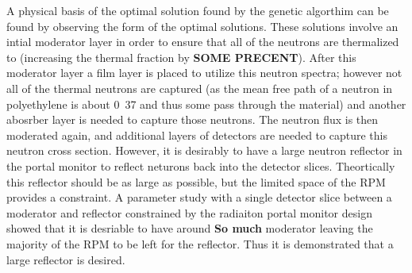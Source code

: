 A physical basis of the optimal solution found by the genetic algorthim can be found by observing the form of the optimal solutions.
These solutions involve an intial moderator layer in order to ensure that all of the neutrons are thermalized to (increasing the thermal fraction by \textbf{SOME PRECENT}).
After this moderator layer a film layer is placed to utilize this neutron spectra; however not all of the thermal neutrons are captured (as the mean free path of a neutron in polyethylene is about \si{0.37}{\cm} and thus some pass through the material) and another abosrber layer is needed to capture those neutrons.  
The neutron flux is then moderated again, and additional layers of detectors are needed to capture this neutron cross section.
However, it is desirably to have a large neutron reflector in the portal monitor to reflect neturons back into the detector slices. 
Theortically this reflector should be as large as possible, but the limited space of the RPM provides a constraint.
A parameter study with a single detector slice between a moderator and reflector constrained by the radiaiton portal monitor design showed that it is desriable to have around \textbf{So much} moderator leaving the majority of the RPM to be left for the reflector.
Thus it is demonstrated that a large reflector is desired.
